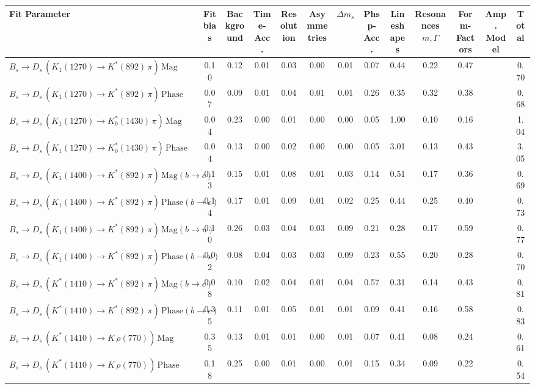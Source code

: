 \begin{tabular}{l  c  c  c  c  c  c  c  c  c  c  c  | c }
\hline
\hline
Fit Parameter & Fit bias & Background & Time-Acc. & Resolution & Asymmetries & $\Delta m_{s}$ & Phsp-Acc. & Lineshapes & Resonances $m,\Gamma$ & Form-Factors & Amp. Model &  Total  \\ 
\hline
$B_s \to D_s \, ( K_1(1270) \to K^{*}(892) \, \pi ) \, \text{Mag}$ & 0.10 & 0.12 & 0.01 & 0.03 & 0.00 & 0.01 & 0.07 & 0.44 & 0.22 & 0.47 &  & 0.70 \\ 
$B_s \to D_s \, ( K_1(1270) \to K^{*}(892) \, \pi ) \, \text{Phase}$ & 0.07 & 0.09 & 0.01 & 0.04 & 0.01 & 0.01 & 0.26 & 0.35 & 0.32 & 0.38 &  & 0.68 \\ 
$B_s \to D_s \, ( K_1(1270) \to K^{*}_{0}(1430) \, \pi ) \, \text{Mag} $ & 0.04 & 0.23 & 0.00 & 0.01 & 0.00 & 0.00 & 0.05 & 1.00 & 0.10 & 0.16 &  & 1.04 \\ 
$B_s \to D_s \, ( K_1(1270) \to K^{*}_{0}(1430) \, \pi ) \, \text{Phase} $ & 0.04 & 0.13 & 0.00 & 0.02 & 0.00 & 0.00 & 0.05 & 3.01 & 0.13 & 0.43 &  & 3.05 \\ 
$B_s \to D_s \, ( K_1(1400) \to K^{*}(892) \, \pi ) \, \text{Mag} (b \to c)$ & 0.13 & 0.15 & 0.01 & 0.08 & 0.01 & 0.03 & 0.14 & 0.51 & 0.17 & 0.36 &  & 0.69 \\ 
$B_s \to D_s \, ( K_1(1400) \to K^{*}(892) \, \pi ) \, \text{Phase} (b \to c)$ & 0.14 & 0.17 & 0.01 & 0.09 & 0.01 & 0.02 & 0.25 & 0.44 & 0.25 & 0.40 &  & 0.73 \\ 
$B_s \to D_s \, ( K_1(1400) \to K^{*}(892) \, \pi ) \, \text{Mag} (b \to u)$ & 0.10 & 0.26 & 0.03 & 0.04 & 0.03 & 0.09 & 0.21 & 0.28 & 0.17 & 0.59 &  & 0.77 \\ 
$B_s \to D_s \, ( K_1(1400) \to K^{*}(892) \, \pi ) \, \text{Phase} (b \to u)$ & 0.02 & 0.08 & 0.04 & 0.03 & 0.03 & 0.09 & 0.23 & 0.55 & 0.20 & 0.28 &  & 0.70 \\ 
$B_s \to D_s \, ( K^{*}(1410) \to K^{*}(892) \, \pi ) \, \text{Mag} (b \to c)$ & 0.08 & 0.10 & 0.02 & 0.04 & 0.01 & 0.04 & 0.57 & 0.31 & 0.14 & 0.43 &  & 0.81 \\ 
$B_s \to D_s \, ( K^{*}(1410) \to K^{*}(892) \, \pi ) \, \text{Phase} (b \to c)$ & 0.35 & 0.11 & 0.01 & 0.05 & 0.01 & 0.01 & 0.09 & 0.41 & 0.16 & 0.58 &  & 0.83 \\ 
$B_s \to D_s \, ( K^{*}(1410) \to K \, \rho(770) ) \, \text{Mag}$ & 0.35 & 0.13 & 0.01 & 0.01 & 0.00 & 0.01 & 0.07 & 0.41 & 0.08 & 0.24 &  & 0.61 \\ 
$B_s \to D_s \, ( K^{*}(1410) \to K \, \rho(770) ) \, \text{Phase}$ & 0.18 & 0.25 & 0.00 & 0.01 & 0.00 & 0.01 & 0.15 & 0.34 & 0.09 & 0.22 &  & 0.54 \\ 

\end{tabular}
